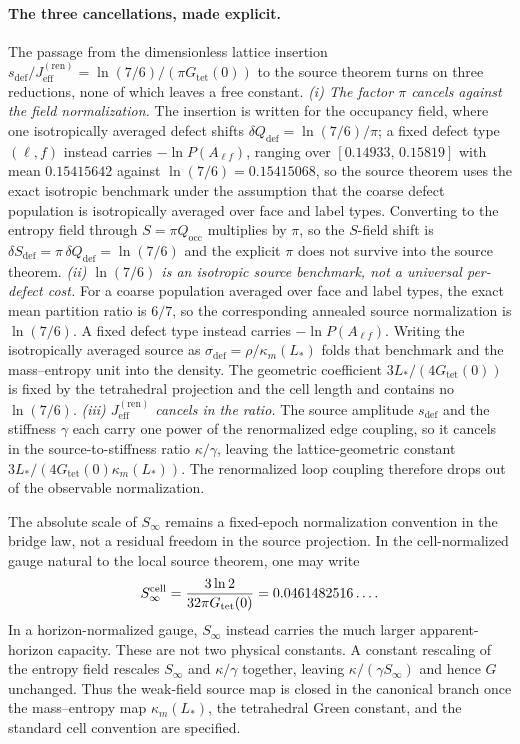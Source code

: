 \documentclass[11pt]{article}
\begin{document}
\paragraph{The three cancellations, made explicit.}
The passage from the dimensionless lattice insertion $s_{\mathrm{def}}/J_{\mathrm{eff}}^{(\mathrm{ren})}=\ln(7/6)/(\pi G_{\mathrm{tet}}(0))$ to the source theorem turns on three reductions, none of which leaves a free constant.
\emph{(i) The factor $\pi$ cancels against the field normalization.} The insertion is written for the occupancy field, where one isotropically averaged defect shifts $\delta Q_{\mathrm{def}}=\ln(7/6)/\pi$; a fixed defect type $(\ell,f)$ instead carries $-\ln P(A_{\ell f})$, ranging over $[0.14933,\,0.15819]$ with mean $0.15415642$ against $\ln(7/6)=0.15415068$, so the source theorem uses the exact isotropic benchmark under the assumption that the coarse defect population is isotropically averaged over face and label types. Converting to the entropy field through $S=\pi Q_{\mathrm{occ}}$ multiplies by $\pi$, so the $S$-field shift is $\delta S_{\mathrm{def}}=\pi\,\delta Q_{\mathrm{def}}=\ln(7/6)$ and the explicit $\pi$ does not survive into the source theorem.
\emph{(ii) $\ln(7/6)$ is an isotropic source benchmark, not a universal per-defect cost.} For a coarse population averaged over face and label types, the exact mean partition ratio is $6/7$, so the corresponding annealed source normalization is $\ln(7/6)$. A fixed defect type instead carries $-\ln P(A_{\ell f})$. Writing the isotropically averaged source as $\sigma_{\mathrm{def}}=\rho/\kappa_m(L_*)$ folds that benchmark and the mass--entropy unit into the density. The geometric coefficient $3L_*/(4G_{\mathrm{tet}}(0))$ is fixed by the tetrahedral projection and the cell length and contains no $\ln(7/6)$.
\emph{(iii) $J_{\mathrm{eff}}^{(\mathrm{ren})}$ cancels in the ratio.} The source amplitude $s_{\mathrm{def}}$ and the stiffness $\gamma$ each carry one power of the renormalized edge coupling, so it cancels in the source-to-stiffness ratio $\kappa/\gamma$, leaving the lattice-geometric constant $3L_*/(4G_{\mathrm{tet}}(0)\kappa_m(L_*))$. The renormalized loop coupling therefore drops out of the observable normalization.

The absolute scale of $S_\infty$ remains a fixed-epoch normalization convention in the bridge law, not a residual freedom in the source projection. In the cell-normalized gauge natural to the local source theorem, one may write
\[
S_{\infty}^{\rm cell}
=
\frac{3\ln2}{32\pi G_{\mathrm{tet}}(0)}
=
0.0461482516\ldots .
\]
In a horizon-normalized gauge, $S_\infty$ instead carries the much larger apparent-horizon capacity. These are not two physical constants. A constant rescaling of the entropy field rescales $S_\infty$ and $\kappa/\gamma$ together, leaving $\kappa/(\gamma S_\infty)$ and hence $G$ unchanged. Thus the weak-field source map is closed in the canonical branch once the mass--entropy map $\kappa_m(L_*)$, the tetrahedral Green constant, and the standard cell convention are specified.
\end{document}
